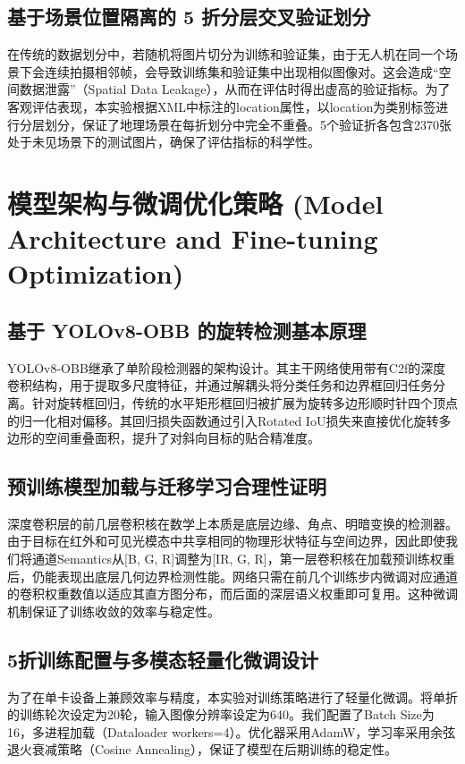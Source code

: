 \documentclass[utf8,a4paper,zihao=-4]{ctexart}
\begin{document}
\subsection{基于场景位置隔离的 5 折分层交叉验证划分}
在传统的数据划分中，若随机将图片切分为训练和验证集，由于无人机在同一个场景下会连续拍摄相邻帧，会导致训练集和验证集中出现相似图像对。这会造成“空间数据泄露”（Spatial Data Leakage），从而在评估时得出虚高的验证指标。为了客观评估表现，本实验根据XML中标注的location属性，以location为类别标签进行分层划分，保证了地理场景在每折划分中完全不重叠。5个验证折各包含2370张处于未见场景下的测试图片，确保了评估指标的科学性。

\section{模型架构与微调优化策略 (Model Architecture and Fine-tuning Optimization)}

\subsection{基于 YOLOv8-OBB 的旋转检测基本原理}
YOLOv8-OBB继承了单阶段检测器的架构设计。其主干网络使用带有C2f的深度卷积结构，用于提取多尺度特征，并通过解耦头将分类任务和边界框回归任务分离。针对旋转框回归，传统的水平矩形框回归被扩展为旋转多边形顺时针四个顶点的归一化相对偏移。其回归损失函数通过引入Rotated IoU损失来直接优化旋转多边形的空间重叠面积，提升了对斜向目标的贴合精准度。

\subsection{预训练模型加载与迁移学习合理性证明}
深度卷积层的前几层卷积核在数学上本质是底层边缘、角点、明暗变换的检测器。由于目标在红外和可见光模态中共享相同的物理形状特征与空间边界，因此即使我们将通道Semantics从[B, G, R]调整为[IR, G, R]，第一层卷积核在加载预训练权重后，仍能表现出底层几何边界检测性能。网络只需在前几个训练步内微调对应通道的卷积权重数值以适应其直方图分布，而后面的深层语义权重即可复用。这种微调机制保证了训练收敛的效率与稳定性。

\subsection{5折训练配置与多模态轻量化微调设计}
为了在单卡设备上兼顾效率与精度，本实验对训练策略进行了轻量化微调。将单折的训练轮次设定为20轮，输入图像分辨率设定为640。我们配置了Batch Size为16，多进程加载（Dataloader workers=4）。优化器采用AdamW，学习率采用余弦退火衰减策略（Cosine Annealing），保证了模型在后期训练的稳定性。
\end{document}
